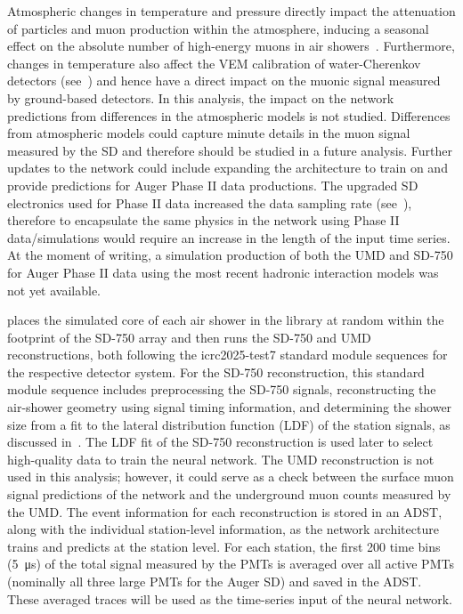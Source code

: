 Atmospheric changes in temperature and pressure directly impact the attenuation of particles and muon production within the atmosphere, inducing a seasonal effect on the absolute number of high-energy muons in air showers~\cite{stef_astropartphys2024_muons}. 
Furthermore, changes in temperature also affect the VEM calibration of water-Cherenkov detectors (see~) and hence have a direct impact on the muonic signal measured by ground-based detectors.
In this analysis, the impact on the network predictions from differences in the atmospheric models is not studied.
Differences from atmospheric models could capture minute details in the muon signal measured by the SD and therefore should be studied in a future analysis.
Further updates to the network could include expanding the architecture to train on and provide predictions for Auger Phase II data productions. 
The upgraded SD electronics used for Phase II data increased the data sampling rate (see~), therefore to encapsulate the same physics in the network using Phase II data/simulations would require an increase in the length of the input time series.
At the moment of writing, a simulation production of both the UMD and SD-750 for Auger Phase II data using the most recent hadronic interaction models was not yet available.

\Offline places the simulated core of each air shower in the library at random within the footprint of the SD-750 array and then runs the SD-750 and UMD reconstructions, both following the icrc2025-test7 standard module sequences for the respective detector system.
For the SD-750 reconstruction, this standard module sequence includes preprocessing the SD-750 signals, reconstructing the air-shower geometry using signal timing information, and determining the shower size from a fit to the lateral distribution function (LDF) of the station signals, as discussed in~.
The LDF fit of the SD-750 reconstruction is used later to select high-quality data to train the neural network. 
The UMD reconstruction is not used in this analysis; however, it could serve as a check between the surface muon signal predictions of the network and the underground muon counts measured by the UMD.
The event information for each reconstruction is stored in an ADST, along with the individual station-level information, as the network architecture trains and predicts at the station level.
For each station, the first 200 time bins (\qty{5}{\micro\second}) of the total signal measured by the PMTs is averaged over all active PMTs (nominally all three large PMTs for the Auger SD) and saved in the ADST.
These averaged traces will be used as the time-series input of the neural network.

